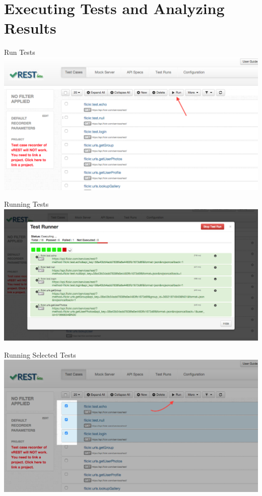 \documentclass{beamer}
\begin{document}
\section{Executing Tests and Analyzing Results}
\begin{frame}{Run Tests}
    \includegraphics[scale=0.30]{images/run_tests.PNG}
\end{frame}
\begin{frame}{Running Tests}
    \includegraphics[scale=0.30]{images/running_tests.PNG}
\end{frame}
\begin{frame}{Running Selected Tests}
    \includegraphics[scale=0.30]{images/running_selected_tests.PNG}
\end{frame}
\end{document}
